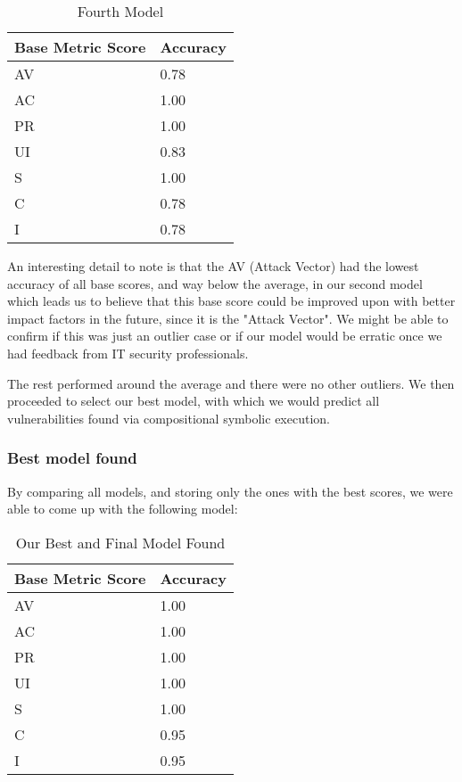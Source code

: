\begin{table}[H]
	\centering
	\caption{Fourth Model}
	\begin{tabular}{ |p{4cm}||p{10cm}|  }
		\hline
		Base Metric Score & Accuracy\\
		\hline
		AV   & 0.78 \\ 
		AC &   1.00  \\
		PR & 1.00  \\
		UI    & 0.83  \\
		S   & 1.00  \\
		C   & 0.78 \\
		I    & 0.78  \\
		\hline
	\end{tabular}
\end{table}

An interesting detail to note is that the AV (Attack Vector) had the lowest accuracy of all base scores, and way below the average, in our second model which leads us to believe that this base score could be improved upon with better impact factors in the future, since it is the "Attack Vector". We might be able to confirm if this was just an outlier case or if our model would be erratic once we had feedback from IT security professionals.

The rest performed around the average and there were no other outliers. We then proceeded to select our best model, with which we would predict all vulnerabilities found via compositional symbolic execution.

\subsubsection{Best model found}

By comparing all models, and storing only the ones with the best scores, we were able to come up with the following model:

\begin{table}[H]
	\centering
	\caption{Our Best and Final Model Found}
	\begin{tabular}{ |p{4cm}||p{10cm}|  }
		\hline
		Base Metric Score & Accuracy\\
		\hline
		AV   & 1.00 \\ 
		AC &   1.00  \\
		PR & 1.00  \\
		UI    & 1.00  \\
		S   & 1.00  \\
		C   & 0.95 \\
		I    & 0.95  \\
		\hline
	\end{tabular}
\end{table}

